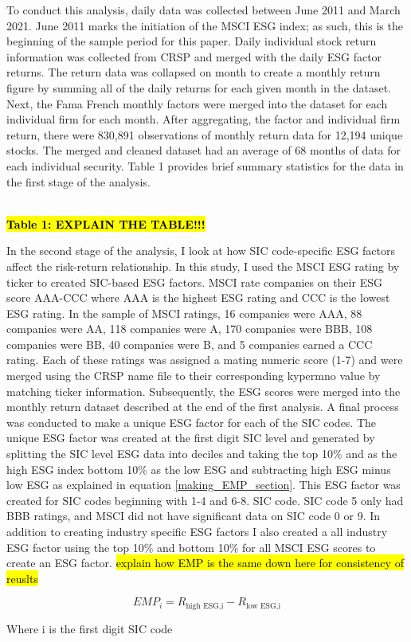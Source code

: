 To conduct this analysis, daily data was collected between June 2011 and March 2021.  June 2011 marks the initiation of the MSCI ESG index; as such, this is the beginning of the sample period for this paper. Daily individual stock return information was collected from CRSP and merged with the daily ESG factor returns. The return data was collapsed on month to create a monthly return figure by summing all of the daily returns for each given month in the dataset. Next, the Fama French monthly factors were merged into the dataset for each individual firm for each month. After aggregating, the factor and individual firm return, there were 830,891 observations of monthly return data for 12,194 unique stocks. The merged and cleaned dataset had an average of 68 months of data for each individual security. Table 1 provides brief summary statistics for the data in the first stage of the analysis.

\begin{center}
    \paperspacingnarrow
    \\
    \textbf{\hl{Table 1: EXPLAIN THE TABLE!!!}}
    \paperspacingwide
\end{center}

In the second stage of the analysis, I look at how SIC code-specific ESG factors affect the risk-return relationship. In this study, I used the MSCI ESG rating by ticker to created SIC-based ESG factors. MSCI rate companies on their ESG score AAA-CCC where AAA is the highest ESG rating and CCC is the lowest ESG rating. In the sample of MSCI ratings, 16 companies were AAA, 88 companies were AA, 118 companies were A, 170 companies were BBB, 108 companies were BB, 40 companies were B, and 5 companies earned a CCC rating.  Each of these ratings was assigned a mating numeric score (1-7) and were merged using the CRSP name file to their corresponding kypermno value by matching ticker information. Subsequently, the ESG scores were merged into the monthly return dataset described at the end of the first analysis. A final process was conducted to make a unique ESG factor for each of the SIC codes. The unique ESG factor was created at the first digit SIC level and generated by splitting the SIC level ESG data into deciles and taking the top 10\% and as the high ESG index bottom 10\% as the low ESG and subtracting high ESG minus low ESG as explained in equation \eqref{making_EMP_section}. This ESG factor was created for SIC codes beginning with 1-4 and 6-8. SIC code. SIC code 5 only had BBB ratings, and MSCI did not have significant data on SIC code 0 or 9. In addition to creating industry specific ESG factors I also created a all industry ESG factor using the top 10\% and bottom 10\% for all MSCI ESG scores to create an ESG factor. \hl{explain how EMP is the same down here for consistency of reuslts}

\begin{equation}
    \label{making_EMP_section}
    EMP_i = R_{\text{high ESG,i}}- R_{\text{low ESG,i}}
\end{equation}

\begin{center}
    Where i is the first digit SIC code    
\end{center}



